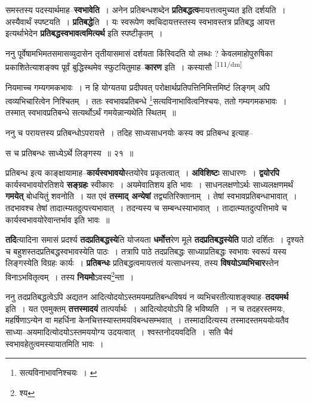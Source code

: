 \documentclass[article,12pt,a4paper]{memoir}
\begin{document}
	  \pstart समस्तस्य पदस्यार्थमाह--\textbf{स्वभावेति} । अनेन प्रतिबन्धशब्देन \textbf{प्रतिबद्धत्व}मायत्तत्वमुच्यत इति दर्शयति । अस्यैवार्थं स्पष्टयति । \textbf{प्रतिबद्धे}ति । यः स्वरूपेण क्वचिदायत्तस्तस्य स्वभावस्तत्र प्रतिबद्ध आयत्त इत्यर्थाभेदेन \textbf{प्रतिबद्धस्वभावत्वमित्यर्थ} इति स्पष्टीकृतम् ।
	\pend
      

	  \pstart ननु पूर्वेषामभिमतसमासव्युदासेन तृतीयासमासं दर्शयता किंस्विदति यो लब्धः ? केवलमाहोपुरुषिका प्रकाशितेत्याशङ्क्य पूर्वं बुद्धिस्थमेव स्फुटयितुमाह--\textbf{कारण} इति । कस्यासौ
	\pend
      \leavevmode\textsuperscript{\rmlatinfont\tiny [111/dm]}

	  \pstart नियमाच्च गम्यगमकभावः । न हि योग्यतया प्रदीपवत् परोक्षार्थप्रतिपत्तिनिमित्तमिष्टं लिङ्गम् अपि त्वव्यभिचारित्वेन निश्चितम् । ततः स्वभावप्रतिबन्धे \footnote{सत्यविनाभावनिश्चयः । \cite{dp-msA} \cite{dp-edP} \cite{dp-edH} \cite{dp-edE} \cite{dp-edN}}सत्यविनाभावित्वनिश्चयः, ततो गम्यगमकभावः । तस्मात् स्वभावप्रतिबन्धे सत्यर्थोऽर्थं गमयेन्नान्यथेति स्थितम् ॥
	\pend
       

	  \pstart ननु च परायत्तस्य प्रतिबन्धोऽपरायत्ते । तदिह साध्यसाधनयोः कस्य क्व प्रतिबन्ध इत्याह--
	\pend
      

	  \pstart स च प्रतिबन्धः साध्येऽर्थे लिङ्गस्य ॥ २१ ॥
	\pend
      

	  \pstart प्रतिबन्ध इत्य काङ्क्षायामाह--\textbf{कार्यस्वभावयो}स्तयोरेव प्रकृतत्वात् । \textbf{अविशिष्टः} साधारणः । \textbf{द्वयोरपि} कार्यस्वभावयोरतिशये \textbf{सङ्ग्रहः} स्वीकारः । अयमेवातिशय इति भावः । साधनलक्षणोऽर्थः साध्यलक्षणमर्थं \textbf{गमयेत्} बोधयितुं शवनोति । यत एवं \textbf{तस्माद् अन्येषां} तद्व्यतिरिक्तानाम् । तेषां स्वभावप्रतिबन्धाभावात् । तदभावश्च तेषां तादात्म्यतदुत्पत्त्यभावात् । तदन्यस्य च सम्बन्धस्याभावात् । तादात्म्यतदुत्पत्तिभावे च कार्यस्वभावयोरेवान्तर्भाव इति भावः ॥
	\pend
      

	  \pstart \textbf{तदि}त्यादिना समासं प्रदर्श्य \textbf{तदप्रतिबद्धस्ये}ति योजयता \textbf{धर्मोत्त}रेण मूले \textbf{तदप्रतिबद्धस्येति} पाठो दर्शितः । दृश्यते च बहुशस्तदप्रतिबद्धस्वभावस्येति पाठः । तत्रापि पाठे तदप्रतिबद्धः साध्याप्रतिबद्धः स्वभावः स्वरूपं यस्य लिङ्गस्येति विग्रहः कार्यः । \textbf{प्रतिबन्धः} प्रतिबद्धत्वमायत्तत्वं यत्साधनस्य, तस्य \textbf{विषयोऽव्यभिचार}स्तेन विनाऽभवितृत्वम् । तस्य \textbf{नियमो}ऽवस्य\footnote{श्य}न्ता ।
	\pend
      

	  \pstart ननु तदप्रतिबद्धत्वेऽपि अद्यतन आदित्योदयोऽस्तमयमप्रतिबन्धविषयं न व्यभिचरतीत्याशङ्क्याह--\textbf{तदयमर्थ} इति । यत एवमुक्तम् \textbf{तत्तस्मादयं} तात्पर्यार्थः । आदित्योदयोऽपि हि भविष्यति । न च तदहरस्तमयः, महर्षिणाऽन्येन वा महर्धिना केनचित्तस्यास्तमयविबन्धसम्भवात् । तस्मादादित्यस्य तस्मादस्तमययोःयतैव साध्या--अयमादित्योदयोऽस्तमययोग्य उदयत्वात् । श्वस्तनोदयवदिति । सति चैवं स्वभावहेतुत्वमस्यायातमिति भावः ।
	\pend
      
\end{document}
